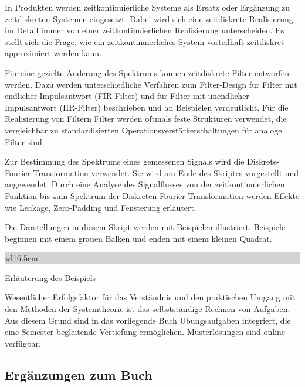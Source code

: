 \noindent In Produkten werden zeitkontinuierliche Systeme als Ersatz oder Erg\"{a}nzung zu zeitdiskreten Systemen eingesetzt. Dabei wird sich eine zeitdiskrete Realisierung im Detail immer von einer zeitkontinuierlichen Realisierung unterscheiden. Es stellt sich die Frage, wie ein zeitkontinuierliches System vorteilhaft zeitdiskret approximiert werden kann.\medskip

\noindent F\"{u}r eine gezielte \"{A}nderung des Spektrums k\"{o}nnen zeitdiskrete Filter entworfen werden. Dazu werden unterschiedliche Verfahren zum Filter-Design f\"{u}r Filter mit endlicher Impulsantwort (FIR-Filter) und f\"{u}r Filter mit unendlicher Impulsantwort (IIR-Filter) beschrieben und an Beispielen verdeutlicht. F\"{u}r die Realisierung von Filtern Filter werden oftmals feste Strukturen verwendet, die vergleichbar zu standardisierten Operationsverst\"{a}rkerschaltungen f\"{u}r analoge Filter sind. \medskip

\noindent Zur Bestimmung des Spektrums eines gemessenen Signals wird die Diskrete-Fourier-Transformation verwendet. Sie wird am Ende des Skriptes vorgestellt und angewendet. Durch eine Analyse des Signalflusses von der zeitkontinuierlichen Funktion bis zum Spektrum der Diskreten-Fourier Transformation werden Effekte wie Leakage, Zero-Padding und Fensterung erl\"{a}utert.\medskip

\noindent Die Darstellungen in diesem Skript werden mit Beispielen illustriert. Beispiele beginnen mit einem grauen Balken und enden mit einem kleinen Quadrat.\bigskip

\noindent
\colorbox{lightgray}{%
%
\renewcommand\arraystretch{0.6}%
\begin{tabular}{ wl{16.5cm} }
{\selectfont
{}}
\end{tabular}%
}\medskip

\noindent Erläuterung des Beispiels \medskip

\noindent Wesentlicher Erfolgsfaktor f\"{u}r das Verst\"{a}ndnis und den praktischen Umgang mit den Methoden der Systemtheorie ist das selbstst\"{a}ndige Rechnen von Aufgaben. Aus diesem Grund sind in das vorliegende Buch \"{U}bungsaufgaben integriert, die eine Semester begleitende Vertiefung erm\"{o}glichen. Musterl\"{o}sungen sind online verf\"{u}gbar.

\clearpage


\subsection{Ergänzungen zum Buch}

